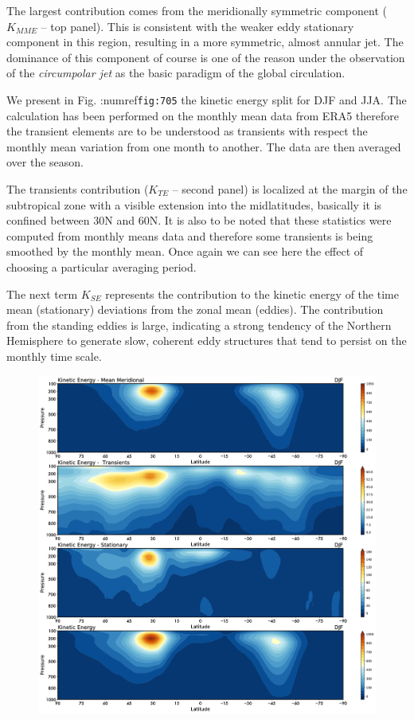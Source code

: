 The largest contribution comes from the meridionally symmetric component
(\(K_{MME}\) -- top panel). This is consistent with the weaker eddy
stationary component in this region, resulting in a more symmetric,
almost annular jet. The dominance of this component of course is one of
the reason under the observation of the \emph{circumpolar jet} as the
basic paradigm of the global circulation.

We present in Fig. :numref\texttt{fig:705} the kinetic energy split for
DJF and JJA. The calculation has been performed on the monthly mean data
from ERA5 therefore the transient elements are to be understood as
transients with respect the monthly mean variation from one month to
another. The data are then averaged over the season.

The transients contribution (\(K_{TE}\) -- second panel) is localized at
the margin of the subtropical zone with a visible extension into the
midlatitudes, basically it is confined between 30N and 60N. It is also
to be noted that these statistics were computed from monthly means data
and therefore some transients is being smoothed by the monthly mean.
Once again we can see here the effect of choosing a particular averaging
period.

The next term \(K_{SE}\) represents the contribution to the kinetic
energy of the time mean (stationary) deviations from the zonal mean
(eddies). The contribution from the standing eddies is large, indicating
a strong tendency of the Northern Hemisphere to generate slow, coherent
eddy structures that tend to persist on the monthly time scale.

\begin{figure}
	\centering
	\includegraphics[width = .7 \textwidth]{figs/GD/DJFKEFlux.png}
	\caption{}\label{}
\end{figure}


